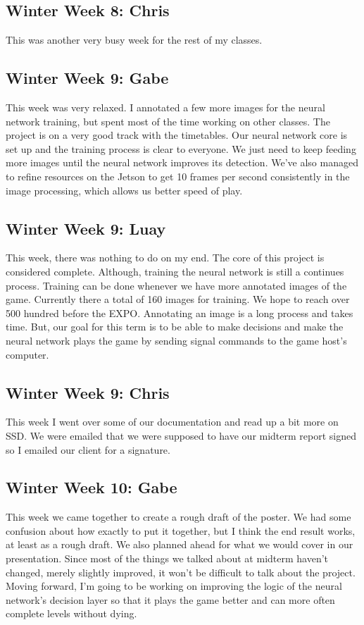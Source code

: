 \documentclass[onecolumn, draftclsnofoot,10pt, compsoc]{IEEEtran}
\begin{document}
\subsection{Winter Week 8: Chris}
This was another very busy week for the rest of my classes.
\subsection{Winter Week 9: Gabe}
This week was very relaxed. I annotated a few more images for the neural network training, but spent most of the time working on other classes. The project is on a very good track with the timetables. Our neural network core is set up and the training process is clear to everyone. We just need to keep feeding more images until the neural network improves its detection. We've also managed to refine resources on the Jetson to get 10 frames per second consistently in the image processing, which allows us better speed of play.
\subsection{Winter Week 9: Luay}
This week, there was nothing to do on my end. The core of this project is considered complete. Although, training the neural network is still a continues process. Training can be done whenever we have more annotated images of the game. Currently there a total of 160 images for training. We hope to reach over 500 hundred before the EXPO. Annotating an image is a long process and takes time. But, our goal for this term is to be able to make decisions and make the neural network plays the game by sending signal commands to the game host's computer.
\subsection{Winter Week 9: Chris}
This week I went over some of our documentation and read up a bit more on SSD. We were emailed that we were supposed to have our midterm report signed so I emailed our client for a signature.
\subsection{Winter Week 10: Gabe}
This week we came together to create a rough draft of the poster. We had some confusion about how exactly to put it together, but I think the end result works, at least as a rough draft. We also planned ahead for what we would cover in our presentation. Since most of the things we talked about at midterm haven't changed, merely slightly improved, it won't be difficult to talk about the project. Moving forward, I'm going to be working on improving the logic of the neural network's decision layer so that it plays the game better and can more often complete levels without dying.
\end{document}
